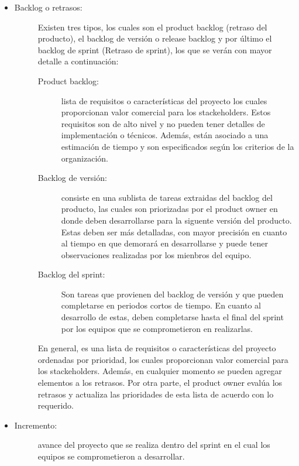 \begin{itemize}
    \item   \begin{description}
                \item[Backlog o retrasos: ] Existen tres tipos, los cuales son el product backlog (retraso del producto), el backlog de versión o release backlog y por último el backlog de sprint (Retraso de sprint), los que se verán con mayor detalle a continuación:
                 
                
                \begin{description}
                    \item[Product backlog: ] lista de requisitos o características del proyecto los cuales proporcionan valor comercial para los stackeholders. Estos requisitos son de alto nivel y no pueden tener detalles de implementación o técnicos. Además, están asociado a una estimación de tiempo y son especificados según los criterios de la organización.
                     
                    \item[Backlog de versión: ]  consiste en una sublista de tareas extraidas del backlog del producto, las cuales son priorizadas por el product owner en donde deben desarrollarse para la siguente versión del producto. Estas deben ser más detalladas, con mayor precisión en cuanto al tiempo en que demorará en desarrollarse y puede tener observaciones realizadas por los mienbros del equipo.
                     
                    \item[Backlog del sprint: ] Son tareas que provienen del backlog de versión y que pueden completarse en periodos cortos de tiempo. En cuanto al desarrollo de estas, deben completarse hasta el final del sprint por los equipos que se comprometieron en realizarlas.
                \end{description}
                
                En general, es una lista de requisitos o características del proyecto ordenadas por prioridad, los cuales proporcionan valor comercial para los stackeholders. Además, en cualquier momento se pueden agregar elementos a los retrasos. Por otra parte, el product owner evalúa los retrasos y actualiza las prioridades de esta lista de acuerdo con lo requerido. 
            \end{description}    

    \item   \begin{description}
                \item[Incremento:] avance del proyecto que se realiza dentro del sprint en el cual los equipos se comprometieron a desarrollar.
            \end{description}
    

\end{itemize}
